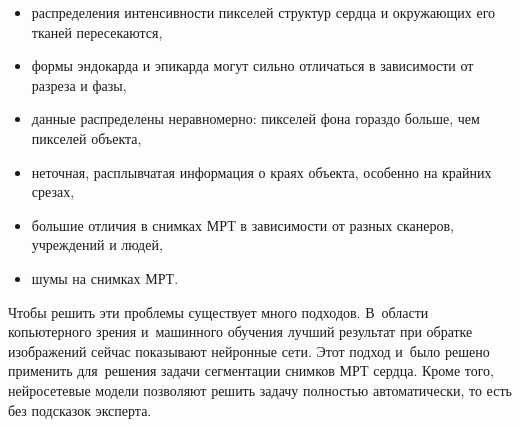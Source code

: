 \begin{itemize}
  \item распределения интенсивности пикселей структур сердца и окружающих его тканей пересекаются,
  \item формы эндокарда и эпикарда могут сильно отличаться в зависимости от разреза и фазы,
  \item данные распределены неравномерно: пикселей фона гораздо больше, чем пикселей объекта,
  \item неточная, расплывчатая информация о краях объекта, особенно на крайних срезах,
  \item большие отличия в снимках МРТ в зависимости от разных сканеров, учреждений и людей,
  \item шумы на снимках МРТ.
\end{itemize}

Чтобы решить эти проблемы существует много подходов. В~области копьютерного зрения и~машинного обучения лучший результат при обратке изображений сейчас показывают нейронные сети. Этот подход и~было решено применить для~решения задачи сегментации снимков МРТ сердца. Кроме того, нейросетевые модели позволяют решить задачу полностью автоматически, то есть без подсказок эксперта.

